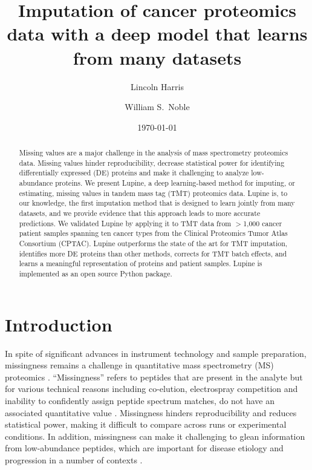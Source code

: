\documentclass{article}
\title{Imputation of cancer proteomics data with a deep model that learns from many datasets}
\author[1]{Lincoln Harris}
\author[1,2]{William S.\ Noble}
\affil[1]{Department of Genome Sciences, University of Washington}
\affil[2]{Paul G.\ Allen School of Computer Science and Engineering,
  University of Washington}
\date{\today}
\begin{document}
\sloppy

\maketitle

\begin{abstract}
\noindent 
Missing values are a major challenge in the analysis of mass spectrometry proteomics data. Missing values hinder reproducibility, decrease statistical power for identifying differentially expressed (DE) proteins and make it challenging to analyze low-abundance proteins. We present Lupine, a deep learning-based method for imputing, or estimating, missing values in tandem mass tag (TMT) proteomics data. Lupine is, to our knowledge, the first imputation method that is designed to learn jointly from many datasets, and we provide evidence that this approach leads to more accurate predictions. We validated Lupine by applying it to TMT data from $>$1,000 cancer patient samples spanning ten cancer types from the Clinical Proteomics Tumor Atlas Consortium (CPTAC). Lupine outperforms the state of the art for TMT imputation, identifies more DE proteins than other methods, corrects for TMT batch effects, and learns a meaningful representation of proteins and patient samples. Lupine is implemented as an open source Python package.
\end{abstract}

\section{Introduction}

In spite of significant advances in instrument technology and sample preparation, missingness remains a challenge in quantitative mass spectrometry (MS) proteomics \cite{Bramer:review, Webb-Robertson:review}. ``Missingness'' refers to peptides that are present in the analyte but for various technical reasons including co-elution, electrospray competition and inability to confidently assign peptide spectrum matches, do not have an associated quantitative value \cite{Bramer:review, Webb-Robertson:review}. Missingness hinders reproducibility and reduces statistical power, making it difficult to compare across runs or experimental conditions. In addition, missingness can make it challenging to glean information from low-abundance peptides, which are important for disease etiology and progression in a number of contexts \cite{veenstra-2006, boschetti-2023, yu-2021}. 
\end{document}
